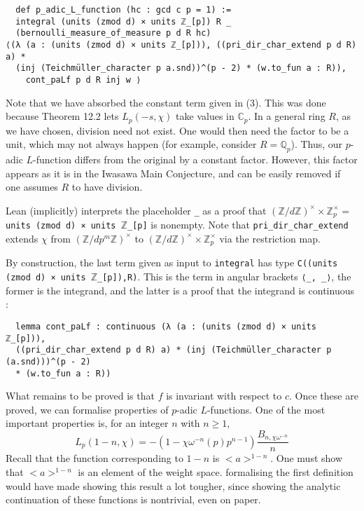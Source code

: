 \documentclass[a4paper,UKenglish,cleveref, autoref, thm-restate]{lipics-v2021}
\newcommand{\lean}[1]{\texttt{#1}\xspace} %
\begin{document}
\begin{lstlisting}
  def p_adic_L_function (hc : gcd c p = 1) :=
  integral (units (zmod d) × units ℤ_[p]) R _ 
  (bernoulli_measure_of_measure p d R hc)
⟨(λ (a : (units (zmod d) × units ℤ_[p])), ((pri_dir_char_extend p d R) a) *
  (inj (Teichmüller_character p a.snd))^(p - 2) * (w.to_fun a : R)), 
    cont_paLf p d R inj w ⟩
\end{lstlisting}

Note that we have absorbed the constant term given in (3). This was done because Theorem 12.2 lets $L_p(-s, \chi)$ take values in $\mathbb{C}_p$. 
In a general ring $R$, as we have chosen, division need not exist. One would then need the factor to be a unit, which may not always happen 
(for example, consider $R = \mathbb{Q}_p$). Thus, our $p$-adic $L$-function differs from the original by a constant factor. 
However, this factor appears as it is in the Iwasawa Main Conjecture, and can be easily removed if one assumes $R$ to have division. 

Lean (implicitly) interprets the placeholder \lean{\_} as a proof that 
\newline $(\mathbb{Z}/d \mathbb{Z})^{\times} \times \mathbb{Z}_p^{\times} = $ \lean{units (zmod d) × units $\mathbb{Z}$\_[p]} is nonempty. 
Note that \lean{pri\_dir\_char\_extend} extends $\chi$
from $(\mathbb{Z}/ dp^m \mathbb{Z})^{\times}$ to $(\mathbb{Z}/ d \mathbb{Z})^{\times} \times \mathbb{Z}_p^{\times}$ via the restriction map. 

By construction, the last term given as input to \lean{integral} has type \newline \lean{C((units (zmod d) × units $\mathbb{Z}$\_[p]),R)}. 
This is the term in angular brackets \lean{⟨\_, \_⟩}, the former is the integrand, and the latter is a proof that the integrand is continuous : 

\begin{lstlisting}
  lemma cont_paLf : continuous (λ (a : (units (zmod d) × units ℤ_[p])),
  ((pri_dir_char_extend p d R) a) * (inj (Teichmüller_character p (a.snd)))^(p - 2)
  * (w.to_fun a : R))
\end{lstlisting}

What remains to be proved is that $f$ is invariant with respect to $c$. 
Once these are proved, we can formalise properties of $p$-adic $L$-functions. One of the most
important properties is, for an integer $n$ with $n \ge 1$,
$$ L_p (1 - n, \chi) = -(1 - \chi \omega^{-n}(p)p^{n - 1}) \frac{B_{n, \chi \omega^{-n}}}{n} $$
Recall that the function corresponding to $1 - n$ is $<a>^{1 - n}$. One must show that $<a>^{1 - n}$ is 
an element of the weight space. formalising the first definition would have made showing this result a 
lot tougher, since showing the analytic continuation of these functions is nontrivial, even on paper.
\end{document}
